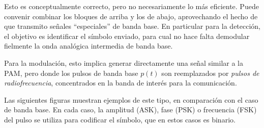 Esto es conceptualmente correcto, pero no necesariamente lo más eficiente. Puede
convenir combinar los bloques de arriba y los de abajo, aprovechando el hecho de que transmito señales ``especiales'' de
banda base. En particular para la detección, el objetivo es identificar el símbolo enviado, para cual no hace
falta demodular fielmente la onda analógica intermedia de banda base.

Para la modulación, esto implica generar directamente una señal
similar a la PAM, pero donde los pulsos de banda base $p(t)$ son
reemplazados por {\em pulsos de radiofrecuencia}, concentrados en
la banda de interés para la comunicación.

\newpage

Las siguientes figuras muestran ejemplos de este tipo, en comparación con el caso de banda base.
En cada caso, la amplitud (ASK), fase (PSK) o frecuencia (FSK) del pulso se utiliza para codificar el
símbolo, que en estos casos es binario.

